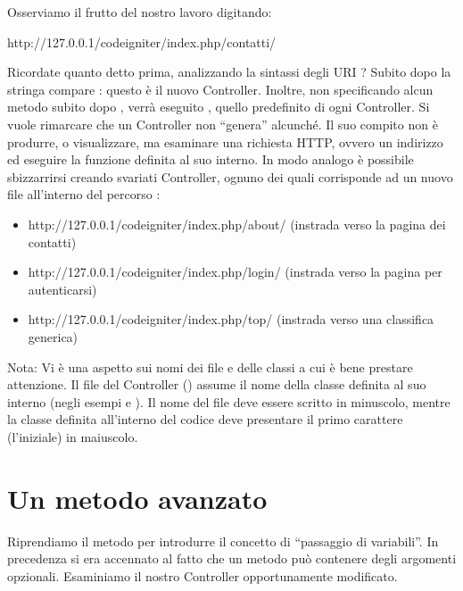 Osserviamo il frutto del nostro lavoro digitando:

\begin{code}
http://127.0.0.1/codeigniter/index.php/contatti/
\end{code}

Ricordate quanto detto prima, analizzando la sintassi degli \ac{URI} ? Subito dopo la stringa  compare : questo è il nuovo Controller. Inoltre, non specificando alcun metodo subito dopo , verrà eseguito , quello predefinito di ogni Controller. Si vuole rimarcare che un Controller non ``genera'' alcunché. Il suo compito non è produrre, o visualizzare, ma esaminare una richiesta \ac{HTTP}, ovvero un indirizzo ed eseguire la funzione definita al suo interno. In modo analogo è possibile sbizzarrirsi creando svariati Controller, ognuno dei quali corrisponde ad un nuovo file all'interno del percorso :

\begin{itemize}
\item http://127.0.0.1/codeigniter/index.php/about/ (instrada verso la pagina dei contatti)
\item http://127.0.0.1/codeigniter/index.php/login/ (instrada verso la pagina per autenticarsi)
\item http://127.0.0.1/codeigniter/index.php/top/ (instrada verso una classifica generica)
\end{itemize}

Nota: Vi è una aspetto sui nomi dei file e delle classi a cui è bene prestare attenzione. Il file del Controller () assume il nome della classe definita al suo interno (negli esempi  e ). Il nome del file deve essere scritto in minuscolo, mentre la classe definita all'interno del codice deve presentare il primo carattere (l'iniziale) in maiuscolo.

\section*{Un metodo avanzato}
Riprendiamo il metodo  per introdurre il concetto di ``passaggio di variabili''. In precedenza si era accennato al fatto che un metodo può contenere degli argomenti opzionali. Esaminiamo il nostro Controller  opportunamente modificato.

\label{list:primocontroller}

